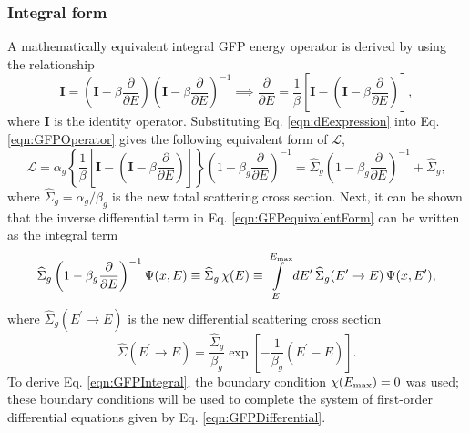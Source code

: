 \documentclass[../main.tex]{subfiles}
\begin{document}
\subsubsection{Integral form}
A mathematically equivalent integral GFP energy operator is derived by using the relationship
\begin{equation} \label{eqn:dEexpression}
  \boldsymbol{I} = (\boldsymbol{I} - \beta \dfrac{\partial}{\partial E})(\boldsymbol{I} - \beta \dfrac{\partial}{\partial E})^{-1} \implies \dfrac{\partial}{\partial E} = \dfrac{1}{\beta} \left[\boldsymbol{I} - \left(\boldsymbol{I} - \beta \dfrac{\partial}{\partial E}\right)\right],
\end{equation}
where $\boldsymbol{I}$ is the identity operator. Substituting Eq. \eqref{eqn:dEexpression} into Eq. \eqref{eqn:GFPOperator} gives the following equivalent form of $\mathcal{L}$,
\begin{equation} \label{eqn:GFPequivalentForm}
  \mathcal{L} = \alpha_g \left\lbrace \dfrac{1}{\beta} \left[\boldsymbol{I} - \left(\boldsymbol{I} - \beta \dfrac{\partial}{\partial E}\right)\right] \right\rbrace \left(1 - \beta_g \dfrac{\partial}{\partial E}\right)^{-1} = \widehat{\Sigma}_g \left(1 - \beta_g \dfrac{\partial}{\partial E}\right)^{-1} + \widehat{\Sigma}_g,
\end{equation}
where $\widehat{\Sigma}_g = \alpha_g / \beta_g$ is the new total scattering cross section. Next, it can be shown that the inverse differential term in Eq. \eqref{eqn:GFPequivalentForm} can be written as the integral term
\begin{equation} \label{eqn:GFPIntegral}
  \widehat{\Sigma}_g \left(1 - \beta_g \dfrac{\partial}{\partial E}\right)^{-1} \Psi(x,E) \equiv \widehat{\Sigma}_g \, \chi(E) \equiv \int\limits_{E}^{\emax} dE^{\prime} \, \widehat{\Sigma}_g(E^{\prime}\rightarrow E) \, \Psi(x,E^{\prime}),
\end{equation}
where $\widehat{\Sigma}_g(E^{\prime}\rightarrow E)$ is the new differential scattering cross section
\begin{equation}
  \widehat{\Sigma}(E^{\prime}\rightarrow E) = \dfrac{\widehat{\Sigma}_g}{\beta_g} \exp \left[ - \dfrac{1}{\beta_g}(E^{\prime} - E)\right].
\end{equation}
To derive Eq. \eqref{eqn:GFPIntegral}, the boundary condition $\chi(E_{\text{max}}) = 0$ was used; these boundary conditions will be used to complete the system of first-order differential equations given by Eq. \eqref{eqn:GFPDifferential}.
\end{document}
